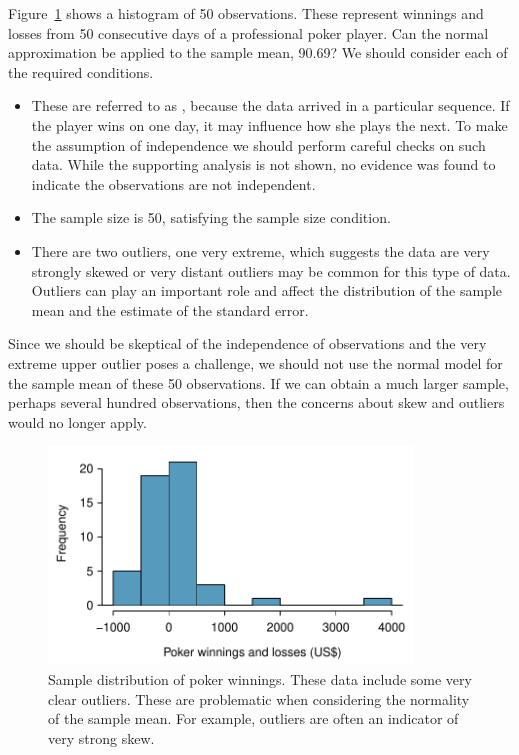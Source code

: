 \begin{example}{Figure~\ref{pokerProfitsCanApplyNormalToSampMean} shows a histogram of 50 observations. These represent winnings and losses from 50 consecutive days of a professional poker player. Can the normal approximation be applied to the sample mean, 90.69?}
We should consider each of the required conditions.
\begin{itemize}
\setlength{\itemsep}{0mm}
\item[(1)] These are referred to as , because the data arrived in a particular sequence. If the player wins on one day, it may influence how she plays the next. To make the assumption of independence we should perform careful checks on such data. While the supporting analysis is not shown, no evidence was found to indicate the observations are not independent.
\item[(2)] The sample size is 50, satisfying the sample size condition.
\item[(3)] There are two outliers, one very extreme, which suggests the data are very strongly skewed or very distant outliers may be common for this type of data. Outliers can play an important role and affect the distribution of the sample mean and the estimate of the standard error.
\end{itemize}
Since we should be skeptical of the independence of observations and the very extreme upper outlier poses a challenge, we should not use the normal model for the sample mean of these 50 observations. If we can obtain a much larger sample, perhaps several hundred observations, then the concerns about skew and outliers would no longer apply.
\end{example}

\begin{figure}[ht]
   \centering
   \includegraphics[height=58mm]{ch_inference_foundations/figures/pokerProfitsCanApplyNormalToSampMean/pokerProfitsCanApplyNormalToSampMean}
   \caption{Sample distribution of poker winnings. These data include some very clear outliers. These are problematic when considering the normality of the sample mean. For example, outliers are often an indicator of very strong skew.}
   \label{pokerProfitsCanApplyNormalToSampMean}
\end{figure}

